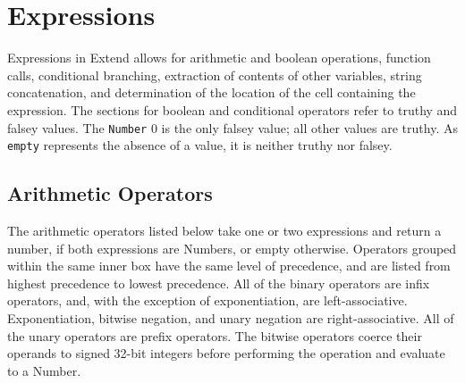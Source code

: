 \section{Expressions}
	Expressions in Extend allows for arithmetic and boolean operations, function calls, conditional branching,  extraction of contents of other variables, string concatenation, and determination of the location of the cell containing the expression. The sections for boolean and conditional operators refer to truthy and falsey values. The \texttt{Number} 0 is the only falsey value; all other values are truthy. As \texttt{empty} represents the absence of a value, it is neither truthy nor falsey.
		\subsection{Arithmetic Operators}
			The arithmetic operators listed below take one or two expressions and return a number, if both expressions are Numbers, or empty otherwise. Operators grouped within the same inner box have the same level of precedence, and are listed from highest precedence to lowest precedence. All of the binary operators are infix operators, and, with the exception of exponentiation, are left-associative. Exponentiation, bitwise negation, and unary negation are right-associative. All of the unary operators are prefix operators. The bitwise operators coerce their operands to signed 32-bit integers before performing the operation and evaluate to a Number.
